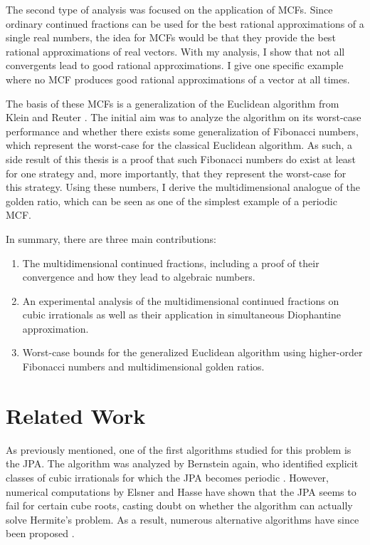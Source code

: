The second type of analysis was focused on the application of MCFs.
Since ordinary continued fractions can be used for the best rational approximations
of a single real numbers, the idea for MCFs would be that they provide the best
rational approximations of real vectors.
With my analysis, I show that not all convergents lead to good rational approximations.
I give one specific example where no MCF produces good rational
approximations of a vector at all times.

The basis of these MCFs is a generalization of the Euclidean algorithm from
Klein and Reuter \cite{Klein24}.
The initial aim was to analyze the algorithm on its worst-case performance
and whether there exists some generalization of Fibonacci numbers,
which represent the worst-case for the classical Euclidean algorithm.
As such, a side result of this thesis is a proof that such Fibonacci numbers do
exist at least for one strategy and, more importantly, that they represent the
worst-case for this strategy.
Using these numbers, I derive the multidimensional analogue of the golden
ratio, which can be seen as one of the simplest example of a periodic MCF.

In summary, there are three main contributions:
\begin{enumerate}
  \item The multidimensional continued fractions,
    including a proof of their convergence and
    how they lead to algebraic numbers.
  \item An experimental analysis of the multidimensional continued fractions
    on cubic irrationals as well as their application in simultaneous
    Diophantine approximation.
  \item Worst-case bounds for the generalized Euclidean algorithm
    using higher-order Fibonacci numbers and multidimensional golden ratios.
\end{enumerate}

\section{Related Work}
\label{sec:related-work}

As previously mentioned,
one of the first algorithms studied for this problem is the JPA.
The algorithm was analyzed by Bernstein \cite{Bernstein71} again,
who identified explicit classes of cubic irrationals for which the JPA
becomes periodic \cite{Bernstein64A, Bernstein65, Bernstein64B}.
However, numerical computations by Elsner and Hasse \cite{Elsner67} have shown
that the JPA seems to fail for certain cube roots,
casting doubt on whether the algorithm can actually solve Hermite’s problem.
As a result, numerous alternative algorithms have since been proposed
\cite{Assaf05, Hendy81, Schweiger00, Schweiger13}.

